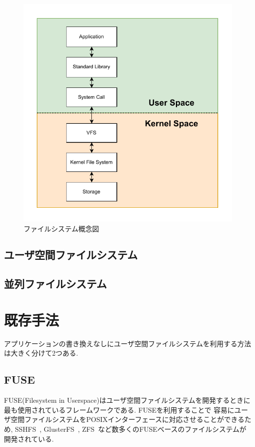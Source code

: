 \documentclass[a4paper,11pt]{jreport}
\begin{document}
\begin{figure}[h]
	\begin{minipage}[b]{1\columnwidth}
		\centering
		\includegraphics[width=0.9\linewidth]{./figure/filesystem.pdf}
		\caption{ファイルシステム概念図}
		\label{fig:Filesystem}
	\end{minipage}
\end{figure}

\section{ユーザ空間ファイルシステム}

\section{並列ファイルシステム}



\chapter{既存手法}
アプリケーションの書き換えなしにユーザ空間ファイルシステムを利用する方法は大きく分けて2つある.
\section{FUSE}
FUSE(Filesystem in Userspace)はユーザ空間ファイルシステムを開発するときに最も使用されているフレームワークである. FUSEを利用することで
容易にユーザ空間ファイルシステムをPOSIXインターフェースに対応させることができるため, SSHFS~\cite{hoskins2006sshfs}, GlusterFS~\cite{davies2013scale}, 
ZFS~\cite{rodeh2003zfs}など数多くのFUSEベースのファイルシステムが開発されている.
\end{document}
